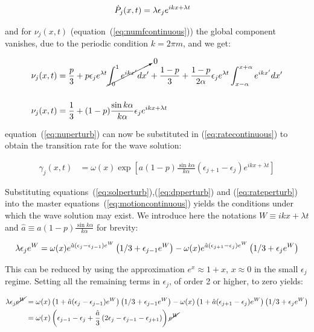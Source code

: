 \begin{align}
  \dot{P}_j(x,t) &= \lambda\epsilon_j e^{ikx + \lambda t}
  \label{eq:dpperturb}
\end{align}

\noindent and for $\nu_j(x,t)$ (equation~(\ref{eq:numfcontinuous})) the global component vanishes, due to the periodic condition
$k=2\pi m$, and we get:

\begin{align}
  \nu_j(x,t) &= \frac{p}{3} + p\epsilon_je^{\lambda t}\cancelto{0}{\int_0^1 e^{ikx'}dx'} +
  \frac{1-p}{3} + \frac{1-p}{2\alpha} \epsilon_je^{\lambda t}\int_{x-\alpha}^{x+\alpha}e^{ikx'}dx' \notag\\[14pt]
  \nu_j(x,t) &= \frac{1}{3} + (1-p)\frac{\sin k\alpha}{k\alpha}\epsilon_je^{ikx+\lambda t}
  \label{eq:nuperturb}
\end{align}

\noindent equation~(\ref{eq:nuperturb}) can now be substituted in (\ref{eq:ratecontinuous}) to obtain the transition rate for the wave
solution:

\begin{align}
  \gamma_j(x,t) &= \omega(x)\exp\left[ a(1-p)\frac{\sin k\alpha}{k\alpha}(\epsilon_{j+1}-\epsilon_j)e^{ikx+\lambda t} \right]
  \label{eq:rateperturb}
\end{align}

Substituting equations~(\ref{eq:solperturb}),(\ref{eq:dpperturb}) and (\ref{eq:rateperturb}) into the master
equations~(\ref{eq:motioncontinuous}) yields the conditions under which the wave solution may exist. We introduce here the notations
$W\equiv ikx + \lambda t$ and $\hat{a}\equiv a(1-p)\frac{\sin k\alpha}{k\alpha}$ for brevity:

\begin{align}
  \lambda \epsilon_je^W = \omega(x)e^{\hat{a}(\epsilon_j-\epsilon_{j-1})e^W}\left(1/3+\epsilon_{j-1}e^W\right)
  - \omega(x)e^{\hat{a}(\epsilon_{j+1}-\epsilon_j)e^W}\left(1/3+\epsilon_je^W\right) \notag
\end{align}

\noindent This can be reduced by using the approximation $e^x \approx 1 + x$, $x\approx 0$ in the small $\epsilon_j$ regime. Setting
all the remaining terms in $\epsilon_j$, of order 2 or higher, to zero yields:

\begin{align}
  \lambda \epsilon_j\cancel{e^W} &= \omega(x)\left(1+\hat{a}(\epsilon_j-\epsilon_{j-1})e^W\right)\left(1/3+\epsilon_{j-1}e^W\right)
  - \omega(x)\left(1+\hat{a}(\epsilon_{j+1}-\epsilon_j)e^W\right)\left(1/3+\epsilon_je^W\right) \notag \\
  &= \omega(x)\left( \epsilon_{j-1} - \epsilon_j + \frac{\hat{a}}{3}\left( 2\epsilon_j - \epsilon_{j-1} - \epsilon_{j+1} \right) \right)\cancel{e^W} \notag
\end{align}

